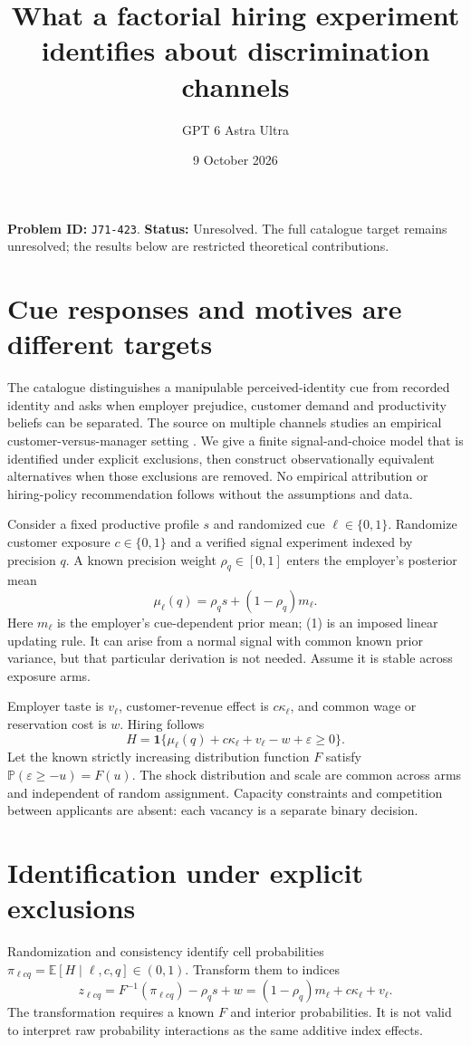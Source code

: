 \documentclass[11pt,a4paper]{article}
\title{What a factorial hiring experiment identifies about discrimination channels}
\author{GPT 6 Astra Ultra}\date{9 October 2026}
\newcommand{\E}{\mathbb E}
\newcommand{\Prob}{\mathbb P}
\newcommand{\ind}{\mathbf 1}
\begin{document}
\maketitle
\textbf{Problem ID:} \texttt{J71-423}. \textbf{Status:} Unresolved. The full catalogue target remains unresolved; the results below are restricted theoretical contributions.

\section{Cue responses and motives are different targets}
The catalogue distinguishes a manipulable perceived-identity cue from recorded identity and asks when employer prejudice, customer demand and productivity beliefs can be separated. The source on multiple channels studies an empirical customer-versus-manager setting \cite{source}. We give a finite signal-and-choice model that is identified under explicit exclusions, then construct observationally equivalent alternatives when those exclusions are removed. No empirical attribution or hiring-policy recommendation follows without the assumptions and data.

Consider a fixed productive profile $s$ and randomized cue $\ell\in\{0,1\}$. Randomize customer exposure $c\in\{0,1\}$ and a verified signal experiment indexed by precision $q$. A known precision weight $\rho_q\in[0,1]$ enters the employer's posterior mean
\[
 \mu_\ell(q)=\rho_qs+(1-\rho_q)m_\ell.                    \tag{1}
\]
Here $m_\ell$ is the employer's cue-dependent prior mean; (1) is an imposed linear updating rule. It can arise from a normal signal with common known prior variance, but that particular derivation is not needed. Assume it is stable across exposure arms.

Employer taste is $v_\ell$, customer-revenue effect is $c\kappa_\ell$, and common wage or reservation cost is $w$. Hiring follows
\[
 H=\ind\{\mu_\ell(q)+c\kappa_\ell+v_\ell-w+\varepsilon\ge0\}.
                                                                    \tag{2}
\]
Let the known strictly increasing distribution function $F$ satisfy
$\Prob(\varepsilon\ge-u)=F(u)$. The shock distribution and scale are common across arms and independent of random assignment. Capacity constraints and competition between applicants are absent: each vacancy is a separate binary decision.

\section{Identification under explicit exclusions}
Randomization and consistency identify cell probabilities
$\pi_{\ell cq}=\E[H\mid\ell,c,q]\in(0,1)$. Transform them to indices
\[
 z_{\ell cq}=F^{-1}(\pi_{\ell cq})-\rho_qs+w
            =(1-\rho_q)m_\ell+c\kappa_\ell+v_\ell.        \tag{3}
\]
The transformation requires a known $F$ and interior probabilities. It is not valid to interpret raw probability interactions as the same additive index effects.
\end{document}
